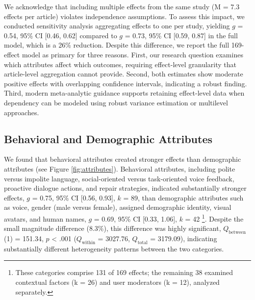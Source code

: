 \documentclass[manuscript,anonymous,sigconf]{acmart}
\begin{document}
We acknowledge that including multiple effects from the same study (M = 7.3 effects per article) violates independence assumptions. To assess this impact, we conducted sensitivity analysis aggregating effects to one per study, yielding $g$ = 0.54, 95\% CI [0.46, 0.62] compared to $g$ = 0.73, 95\% CI [0.59, 0.87] in the full model, which is a 26\% reduction. Despite this difference, we report the full 169-effect model as primary for three reasons. First, our research question examines which attributes affect which outcomes, requiring effect-level granularity that article-level aggregation cannot provide. Second, both estimates show moderate positive effects with overlapping confidence intervals, indicating a robust finding. Third, modern meta-analytic guidance \cite{} supports retaining effect-level data when dependency can be modeled using robust variance estimation or multilevel approaches. 

\subsection{Behavioral and Demographic Attributes} \label{sec:beh}

We found that behavioral attributes created stronger effects than demographic attributes (see Figure \ref{fig:attributes}). Behavioral attributes, including polite versus impolite language, social-oriented versus task-oriented voice feedback, proactive dialogue actions, and repair strategies, indicated substantially stronger effects, $g$ = 0.75, 95\% CI [0.56, 0.93], $k$ = 89, than demographic attributes such as voice, gender (male versus female), assigned demographic identity, visual avatars, and human names, $g$ = 0.69, 95\% CI [0.33, 1.06], $k$ = 42 \footnote{These categories comprise 131 of 169 effects; the remaining 38 examined contextual factors (k = 26) and user moderators (k = 12), analyzed separately.}. Despite the small magnitude difference (8.3\%), this difference was highly significant, $Q_{\text{between}}$(1) = 151.34, $p$ < .001 ($Q_{\text{within}}$ = 3027.76, $Q_{\text{total}}$ = 3179.09), indicating substantially different heterogeneity patterns between the two categories.
\end{document}
